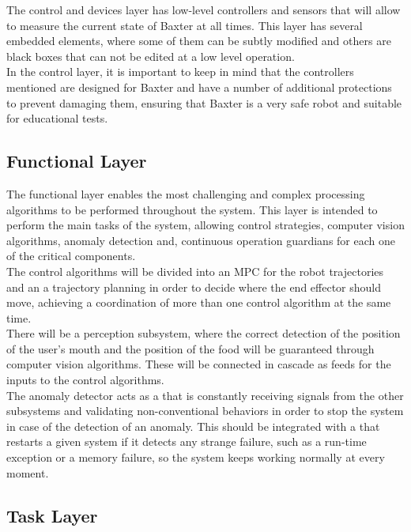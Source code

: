 \documentclass[11pt]{report} %
\begin{document}
The control and devices layer has low-level controllers and sensors that will allow to measure the current state of Baxter at all times. This layer has several embedded elements, where some of them can be subtly modified and others are black boxes that can not be edited at a low level operation.\\

In the control layer, it is important to keep in mind that the controllers mentioned are designed for Baxter and have a number of additional protections to prevent damaging them, ensuring that Baxter is a very safe robot and suitable for educational tests.\\


\subsection{Functional Layer}

The functional layer enables the most challenging and complex processing algorithms to be performed throughout the system. This layer is intended to perform the main tasks of the system, allowing control strategies, computer vision algorithms, anomaly detection and, continuous operation guardians for each one of the critical components.\\

The control algorithms will be divided into an MPC for the robot trajectories and an a trajectory planning in order to decide where the end effector should move, achieving a coordination of more than one control algorithm at the same time.\\

There will be a perception subsystem, where the correct detection of the position of the user's mouth and the position of the food will be guaranteed through computer vision algorithms. These will be connected in cascade as feeds for the inputs to the control algorithms.\\

The anomaly detector acts as a  that is constantly receiving signals from the other subsystems and validating non-conventional behaviors in order to stop the system in case of the detection of an anomaly. This should be integrated with a  that restarts a given system if it detects any strange failure, such as a run-time exception or a memory failure, so the system keeps working normally at every moment.\\

\subsection{Task Layer}
\end{document}
